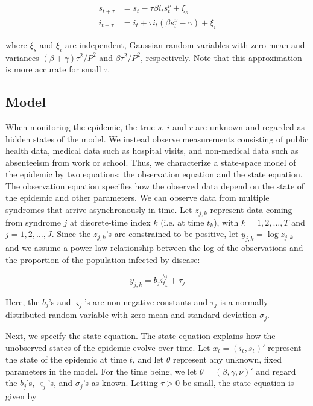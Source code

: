 \documentclass{article}
\begin{document}
\begin{align}
s_{t+\tau} &= s_t - \tau\beta i_ts^\nu_t + \xi_s \label{eqn:s} \\
i_{t+\tau} &= i_t + \tau i_t(\beta s^\nu_t - \gamma) + \xi_i \label{eqn:i}
\end{align}

\noindent where $\xi_s$ and $\xi_i$ are independent, Gaussian random variables with zero mean and variances $(\beta + \gamma)\tau^2/P^2$ and $\beta\tau^2/P^2$, respectively.  Note that this approximation is more accurate for small $\tau$.

\subsection{Model}

When monitoring the epidemic, the true $s$, $i$ and $r$ are unknown and regarded as hidden states of the model.  We instead observe measurements consisting of public health data, medical data such as hospital visits, and non-medical data such as absenteeism from work or school.  Thus, we characterize a state-space model of the epidemic by two equations: the observation equation and the state equation.  The observation equation specifies how the observed data depend on the state of the epidemic and other parameters.  We can observe data from multiple syndromes that arrive asynchronously in time.  Let $z_{j,k}$ represent data coming from syndrome $j$ at discrete-time index $k$ (i.e. at time $t_k$), with $k = 1,2,\ldots,T$ and $j = 1,2,\ldots,J$.  Since the $z_{j,k}$'s are constrained to be positive, let $y_{j,k} = \log z_{j,k}$ and we assume a power law relationship between the log of the observations and the proportion of the population infected by disease:

\begin{equation}
y_{j,k} = b_ji^{\varsigma_j}_{t_k} + \tau_j \label{eqn:obs}
\end{equation}

\noindent Here, the $b_j$'s and $\varsigma_j$'s are non-negative constants and $\tau_j$ is a normally distributed random variable with zero mean and standard deviation $\sigma_j$.

Next, we specify the state equation.  The state equation explains how the unobserved states of the epidemic evolve over time.  Let $x_t = (i_t,s_t)'$ represent the state of the epidemic at time $t$, and let $\theta$ represent any unknown, fixed parameters in the model.  For the time being, we let $\theta = (\beta, \gamma, \nu)'$ and regard the $b_j$'s, $\varsigma_j$'s, and $\sigma_j$'s as known.  Letting $\tau > 0$ be small, the state equation is given by
\end{document}
